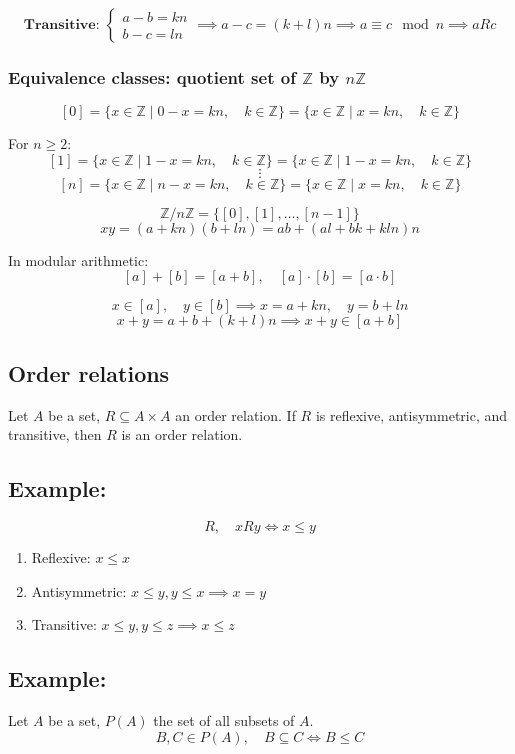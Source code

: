 \documentclass[11pt]{article}
\begin{document}
\[
\textbf{Transitive: } \begin{cases}
    a - b = kn \\
    b - c = ln
\end{cases} \implies a - c = (k + l)n \implies a \equiv c \mod n \implies aRc
\]

 \subsubsection{Equivalence classes: quotient set of $\mathbb{Z}$ by $n\mathbb{Z}$}
\[
[0] = \{x \in \mathbb{Z} \mid 0 - x = kn, \quad k \in \mathbb{Z}\} = \{x \in \mathbb{Z} \mid x = kn, \quad k \in \mathbb{Z}\}
\]

For $n \geq 2$:
\[
[1] = \{x \in \mathbb{Z} \mid 1 - x = kn, \quad k \in \mathbb{Z}\} = \{x \in \mathbb{Z} \mid 1 - x = kn, \quad k \in \mathbb{Z}\}
\]
\[ \vdots \]
\[
[n] = \{x \in \mathbb{Z} \mid n - x = kn, \quad k \in \mathbb{Z}\} = \{x \in \mathbb{Z} \mid x = kn, \quad k \in \mathbb{Z}\}
\]

\[
\mathbb{Z}/n\mathbb{Z} = \{[0], [1], \ldots, [n-1]\}
\]
\[
xy = (a + kn)(b + ln) = ab + (al + bk + kln)n
\]

In modular arithmetic: 
\[
[a] + [b] = [a + b], \quad [a] \cdot [b] = [a \cdot b]
\]

\[
x \in [a], \quad y \in [b] \implies x = a + kn, \quad y = b + ln
\]
\[
x + y = a + b + (k + l)n \implies x + y \in [a + b]
\]

\subsection{Order relations}
Let $A$ be a set, $R \subseteq A \times A$ an order relation. If $R$ is reflexive, antisymmetric, and transitive, then $R$ is an order relation.

\subsection*{Example:}
\[
R, \quad xRy \Longleftrightarrow x \leq y
\]

\begin{enumerate}
    \item Reflexive: $x \leq x$
    \item Antisymmetric: $x \leq y, y \leq x \implies x = y$
    \item Transitive: $x \leq y, y \leq z \implies x \leq z$
\end{enumerate}

\subsection*{Example:}
Let $A$ be a set, $P(A)$ the set of all subsets of $A$.
\[
B, C \in P(A), \quad B \subseteq C \Longleftrightarrow B \leq C
\]
\end{document}
